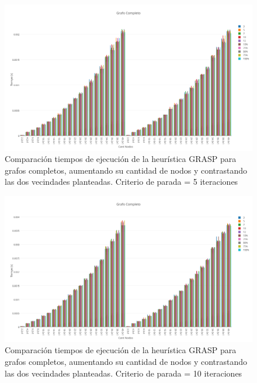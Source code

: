   \begin{figure}[h!]
   \begin{center}
 	\includegraphics[scale=0.35]{imagenes/grasp/completo-5repes.png}
 	\caption{Comparaci\'on tiempos de ejecuci\'on de la heur\'istica GRASP para grafos completos, aumentando su cantidad de nodos y contrastando las dos vecindades planteadas. Criterio de parada = 5 iteraciones}
   \end{center}
 \end{figure}

  \begin{figure}[h!]
   \begin{center}
 	\includegraphics[scale=0.35]{imagenes/grasp/completo-10repes.png}
 	\caption{Comparaci\'on tiempos de ejecuci\'on de la heur\'istica GRASP para grafos completos, aumentando su cantidad de nodos y contrastando las dos vecindades planteadas. Criterio de parada = 10 iteraciones}
   \end{center}
 \end{figure}
\newpage

